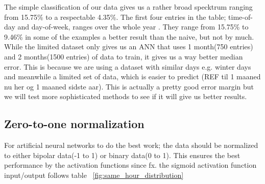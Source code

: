 \begin{table}[!ht]
\centering  %
\caption{Results from the simple classification approach} %
\label{table:naiveTrainingApproach} %
\end{table}

The simple classification of our data gives us a rather broad specktrum ranging from 15.75\% to a respectable 4.35\%. The first four entries in the table; time-of-day and day-of-week, ranges over the whole year . They range from 15.75\% to 9.46\% in some of the examples a better result than the naive, but not by much. While the limited dataset only gives us an ANN that uses 1 month(750 entries) and 2 months(1500 entries) of data to train, it gives us a way better median error. This is because we are using a dataset with similar days e.g. winter days and meanwhile a limited set of data, which is easier to predict (REF til 1 maaned nu her og 1 maaned sidste aar). This is actually a pretty good error margin but we will test more sophisticated methods to see if it will give us better results. 

\subsection{Zero-to-one normalization}
For artificial neural networks to do the best work; the data should be normalized to either bipolar data(-1 to 1) or binary data(0 to 1). This ensures the best performance by the activation functions since fx. the sigmoid activation function input/output follows table ~\ref{fig:same_hour_distribution}

